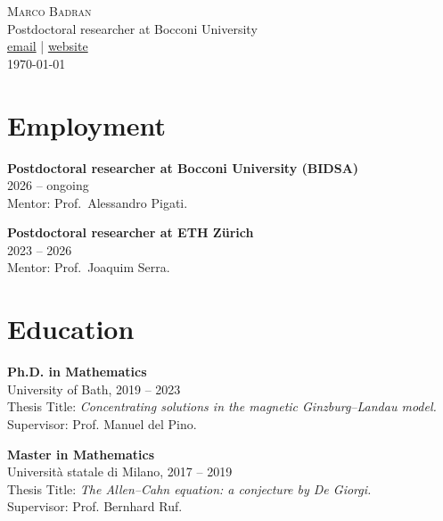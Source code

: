 \documentclass[a4paper,11pt]{article}
\newcommand{\changed}[1]{#1}
\begin{document}
\begin{center}
    {\Large \textsc{Marco Badran}} \\
    \vspace{2mm}
    \changed{Postdoctoral researcher at Bocconi University} \\
    \vspace{2mm}
    \changed{\href{mailto:marco.badran@unibocconi.it}{email} | \href{https://marco-badran.github.io/}{website}}\\
    \today
\end{center}

\vspace{10mm}

\section*{Employment}
\noindent
\changed{\textbf{Postdoctoral researcher at Bocconi University (BIDSA)} \\
2026 -- ongoing \\
Mentor: Prof.\ Alessandro Pigati.}

\vspace{3mm}

\changed{\textbf{Postdoctoral researcher at ETH Z\"urich} \\
2023 -- 2026 \\
Mentor: Prof.\ Joaquim Serra.}

\vspace{5mm}

\section*{Education}
\noindent
\textbf{Ph.D. in Mathematics} \\
University of Bath, 2019 -- 2023 \\
Thesis Title: \textit{Concentrating solutions in the magnetic Ginzburg--Landau model.} \\
Supervisor: Prof. Manuel del Pino.

\vspace{3mm}

\textbf{Master in Mathematics} \\
Università statale di Milano, 2017 -- 2019 \\
Thesis Title: \textit{The Allen--Cahn equation: a conjecture by De Giorgi.} \\
Supervisor: Prof. Bernhard Ruf.

\vspace{3mm}
\end{document}
